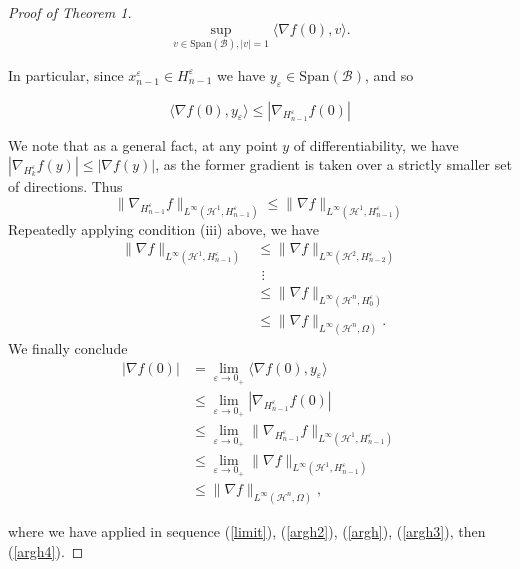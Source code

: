 \documentclass{article}
\begin{document}
\begin{proof}[Proof of Theorem 1]
$$\sup_{v \in \text{Span}(\mathcal B), |v| = 1} \langle \nabla f(0), v\rangle.$$

\noindent In particular, since $x^\varepsilon_{n-1} \in H^\varepsilon_{n-1}$ we have $y_\varepsilon \in \text{Span}(\mathcal B)$, and so 

\begin{equation}\label{argh2}\langle \nabla f(0), y_\varepsilon \rangle \leq |\nabla_{H^\varepsilon_{n-1}}f(0)|\end{equation}

\noindent We note that as a general fact, at any point $y$ of differentiability, we have $|\nabla_{H^{\varepsilon}_k} f(y)| \leq |\nabla f(y)|$, as the former gradient is taken over a strictly smaller set of directions. Thus
\begin{equation}\label{argh3}\|\nabla_{H^\varepsilon_{n-1}} f\|_{L^\infty(\mathcal H^{1}, H^\varepsilon_{n-1})} \leq \|\nabla f\|_{L^\infty(\mathcal H^{1}, H^\varepsilon_{n-1})} \end{equation}
\noindent Repeatedly applying condition (iii) above, we have
\begin{equation}\label{argh4}\begin{aligned} \|\nabla f\|_{L^\infty(\mathcal H^{1}, H^\varepsilon_{n-1})} &\leq \|\nabla f\|_{L^\infty(\mathcal H^{2}, H^\varepsilon_{n-2})} \\
&\ \,\vdots \\
&\leq \|\nabla f\|_{L^\infty(\mathcal H^{n}, H^\varepsilon_0)}\\
& \leq \|\nabla f\|_{L^\infty (\mathcal H^n, \Omega)}. \end{aligned}\end{equation}
\noindent We finally conclude
$$\begin{aligned}|\nabla f(0)| & = \lim_{\varepsilon \to 0_+} \langle \nabla f(0), y_\varepsilon \rangle \\
&\leq \lim_{\varepsilon \to 0_+} |\nabla_{H^\varepsilon_{n-1}} f(0)| \\
&\leq \lim_{\varepsilon \to 0_+} \|\nabla_{H^\varepsilon_{n-1}} f\|_{L^\infty(\mathcal H^{1}, H^\varepsilon_{n-1})} \\
&\leq \lim_{\varepsilon \to 0_+} \|\nabla f\|_{L^\infty(\mathcal H^{1}, H^\varepsilon_{n-1})}\\
& \leq  \|\nabla f\|_{L^\infty (\mathcal H^n, \Omega)}, \end{aligned}$$

where we have applied in sequence (\ref{limit}), (\ref{argh2}), (\ref{argh}), (\ref{argh3}), then (\ref{argh4}). \end{proof}
\end{document}
